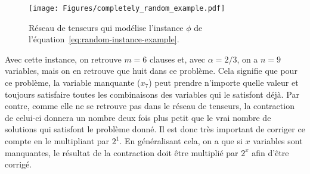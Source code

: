 \begin{figure}[h]
    \centering
    \texttt{[image: Figures/completely\_random\_example.pdf]}
    \caption{Réseau de tenseurs qui modélise l'instance $\phi$ de l'équation~\ref{eq:random-instance-example}.}
    \label{fig:random-instance-example}
\end{figure}
Avec cette instance, on retrouve $m = 6$ clauses et, avec $\alpha = 2/3$, on a $n = 9$ variables, mais on en retrouve que huit dans ce problème.
Cela signifie que pour ce problème, la variable manquante ($x_7$) peut prendre n'importe quelle valeur et toujours satisfaire toutes les combinaisons des variables qui le satisfont déjà.
Par contre, comme elle ne se retrouve pas dans le réseau de tenseurs, la contraction de celui-ci donnera un nombre deux fois plus petit que le vrai nombre de solutions qui satisfont le problème donné.
Il est donc très important de corriger ce compte en le multipliant par $2^1$.
En généralisant cela, on a que si $x$ variables sont manquantes, le résultat de la contraction doit être multiplié par $2^x$ afin d'être corrigé.


